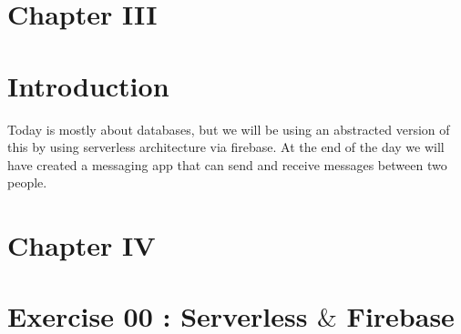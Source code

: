 \documentclass[12pt]{report}
\begin{document}
\vspace{\baselineskip}

\vspace{\baselineskip}



\newpage

\vspace{\baselineskip}
\vspace{\baselineskip}
\section*{Chapter III}
\section*{Introduction}
Today is mostly about databases, but we will be using an abstracted version of this by using serverless architecture via firebase. At the end of the day we will have created a messaging app that can send and receive messages between two people. \par


\vspace{\baselineskip}



\newpage

\vspace{\baselineskip}
\vspace{\baselineskip}
\section*{Chapter IV}
\section*{Exercise 00 : Serverless $\&$  Firebase}

\vspace{\baselineskip}

\vspace{\baselineskip}

\vspace{\baselineskip}


\end{document}
